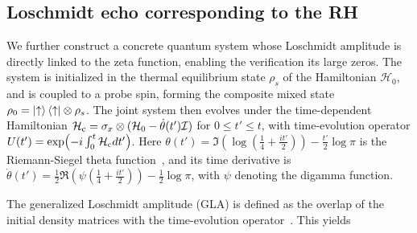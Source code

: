 \documentclass[aps,pra,twocolumn,superscriptaddress,preprintnumbers,amsmath,amssymb]{revtex4-2}
\begin{document}
\subsection{Loschmidt echo corresponding to the RH}\label{model2}

We further construct a concrete quantum system  
whose Loschmidt amplitude is directly linked to the zeta function, enabling the verification its large  zeros. 
The system is initialized in the thermal equilibrium state $\rho_s$ of the Hamiltonian $\mathcal{H}_0$, and is coupled to a probe spin, 
forming the composite mixed state $\rho_0 = \ket{\uparrow}\bra{\uparrow} \otimes \rho_s$. 
The joint system then evolves  under the  time-dependent Hamiltonian 
$\mathcal{H}_{\rm c} = \sigma_x \otimes (\mathcal{H}_0-\dot{\theta}(t')\mathcal{I})$ for $0\leq t'\leq t$, with time-evolution operator
$U(t') = \exp(-i\textstyle\int_{0}^{t}\mathcal{H}_{\rm c} dt')$. 
Here $\theta(t')= \Im(\log(\tfrac{1}{4} + \tfrac{i t'}{2})) - \tfrac{t'}{2}\log \pi$ is the Riemann-Siegel theta function~\cite{de2011high}, and its time derivative is $\dot{\theta}(t')=\tfrac{1}{2}\Re(\psi(\tfrac14+\tfrac{i t'}{2}))-\tfrac{1}{2}\log\pi$, with $\psi$ denoting the digamma function.\par
The generalized Loschmidt amplitude (GLA) is defined as the overlap of the initial  density matrices with the time-evolution operator~\cite{heyl2017dynamical}. This yields
\end{document}
